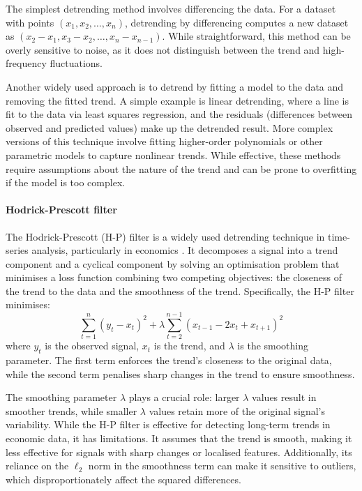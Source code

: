 The simplest detrending method involves differencing the data. For a dataset with points $(x_1, x_2, \ldots, x_n)$, detrending by differencing computes a new dataset as $(x_2 - x_1, x_3 - x_2, \ldots, x_n - x_{n-1})$. While straightforward, this method can be overly sensitive to noise, as it does not distinguish between the trend and high-frequency fluctuations.

Another widely used approach is to detrend by fitting a model to the data and removing the fitted trend. A simple example is linear detrending, where a line is fit to the data via least squares regression, and the residuals (differences between observed and predicted values) make up the detrended result. More complex versions of this technique involve fitting higher-order polynomials or other parametric models to capture nonlinear trends. While effective, these methods require assumptions about the nature of the trend and can be prone to overfitting if the model is too complex.

\paragraph{Hodrick-Prescott filter}
The Hodrick-Prescott (H-P) filter is a widely used detrending technique in time-series analysis, particularly in economics \cite{hodrick_postwar_1997}. It decomposes a signal into a trend component and a cyclical component by solving an optimisation problem that minimises a loss function combining two competing objectives: the closeness of the trend to the data and the smoothness of the trend. Specifically, the H-P filter minimises:
\begin{equation}
    \sum_{t=1}^n (y_t - x_t)^2 + \lambda \sum_{t=2}^{n-1} (x_{t-1} - 2x_t + x_{t+1})^2
\end{equation}
where $y_t$ is the observed signal, $x_t$ is the trend, and $\lambda$ is the smoothing parameter. The first term enforces the trend's closeness to the original data, while the second term penalises sharp changes in the trend to ensure smoothness.

The smoothing parameter $\lambda$ plays a crucial role: larger $\lambda$ values result in smoother trends, while smaller $\lambda$ values retain more of the original signal's variability. While the H-P filter is effective for detecting long-term trends in economic data, it has limitations. It assumes that the trend is smooth, making it less effective for signals with sharp changes or localised features. Additionally, its reliance on the $\ell_2$ norm in the smoothness term can make it sensitive to outliers, which disproportionately affect the squared differences.

